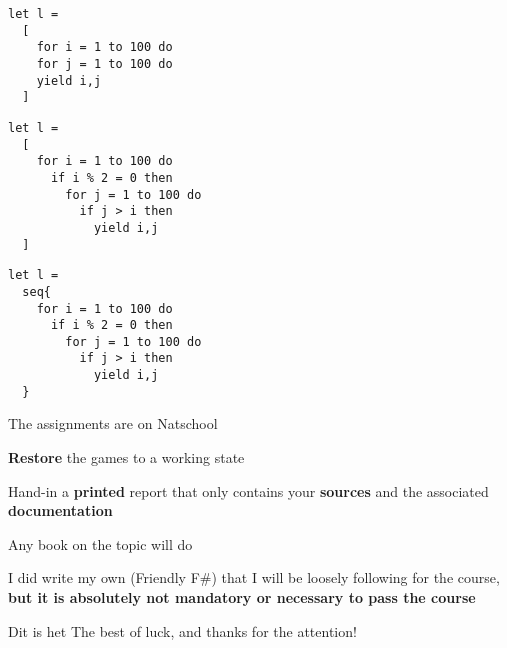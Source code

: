 \documentclass{beamer}
\begin{document}
\begin{frame}[fragile]
\begin{lstlisting}
let l =
  [
    for i = 1 to 100 do 
    for j = 1 to 100 do 
    yield i,j
  ]
\end{lstlisting}
\end{frame}

\begin{frame}[fragile]
\begin{lstlisting}
let l =
  [
    for i = 1 to 100 do 
      if i % 2 = 0 then
        for j = 1 to 100 do 
          if j > i then
            yield i,j
  ]
\end{lstlisting}
\end{frame}

\begin{frame}[fragile]
\begin{lstlisting}
let l =
  seq{
    for i = 1 to 100 do 
      if i % 2 = 0 then
        for j = 1 to 100 do 
          if j > i then
            yield i,j
  }
\end{lstlisting}
\end{frame}



\begin{slide}{
\item The assignments are on Natschool
\item \textbf{Restore} the games to a working state
\item Hand-in a \textbf{printed} report that only contains your \textbf{sources} and the associated \textbf{documentation}
}\end{slide}

\begin{slide}{
\item Any book on the topic will do
\item I did write my own (Friendly F\#) that I will be loosely following for the course, \textbf{but it is absolutely not mandatory or necessary to pass the course}
}\end{slide}


\begin{frame}{Dit is het}
\center
\fontsize{18pt}{7.2}\selectfont
The best of luck, and thanks for the attention!
\end{frame}
\end{document}
